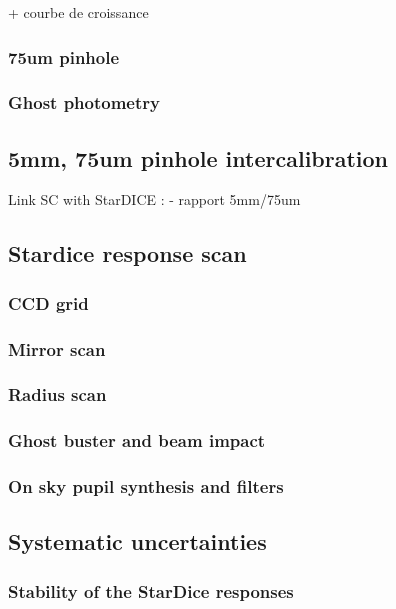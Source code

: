 \documentclass[onecolumn]{aa}
\begin{document}
+ courbe de croissance

\subsubsection{75um pinhole}

\subsubsection{Ghost photometry}

\subsection{5mm, 75um pinhole intercalibration}

Link SC with StarDICE :
- rapport 5mm/75um

\subsection{Stardice response scan}

\subsubsection{CCD grid}

\subsubsection{Mirror scan}

\subsubsection{Radius scan}

\subsubsection{Ghost buster and beam impact}

\subsubsection{On sky pupil synthesis and filters}



\subsection{Systematic uncertainties}
\label{sec:systematics}

\subsubsection{Stability of the StarDice responses}
\end{document}

